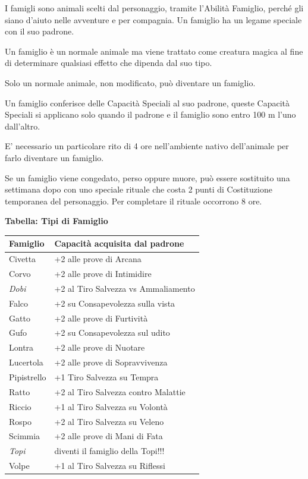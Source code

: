 \begin{multicols}{2}

I famigli sono animali scelti dal personaggio, tramite l'Abilità Famiglio, perché gli siano d'aiuto nelle avventure e per compagnia. Un famiglio ha un legame speciale con il suo padrone.

Un famiglio è un normale animale ma viene trattato come creatura magica al fine di determinare qualsiasi effetto che dipenda dal suo tipo.

Solo un normale animale, non modificato, può diventare un famiglio.

Un famiglio conferisce delle Capacità Speciali al suo padrone, queste Capacità Speciali si applicano solo quando il padrone e il famiglio sono entro 100 m l'uno dall'altro.

E' necessario un particolare rito di 4 ore nell'ambiente nativo dell'animale per farlo diventare un famiglio.

Se un famiglio viene congedato, perso oppure muore, può essere sostituito una settimana dopo con uno speciale rituale che costa 2 punti di Costituzione temporanea del personaggio. Per completare il rituale occorrono 8 ore.

\medskip

\textbf{Tabella: Tipi di Famiglio}

\medskip

\noindent\begin{tabularx}{0.5\textwidth}{lX}
\textbf{Famiglio} & \textbf{Capacità acquisita dal padrone}\\
\toprule
Civetta & +2 alle prove di Arcana\\
Corvo & +2 alle prove di Intimidire\\
\emph{Dobi}& +2 al Tiro Salvezza vs Ammaliamento\\
Falco & +2 su Consapevolezza sulla vista\\
Gatto & +2 alle prove di Furtività\\
Gufo & +2 su Consapevolezza sul udito\\
Lontra & +2 alle prove di Nuotare\\
Lucertola & +2 alle prove di Sopravvivenza\\
Pipistrello & +1 Tiro Salvezza su Tempra\\
Ratto & +2 al Tiro Salvezza contro Malattie\\
Riccio & +1 al Tiro Salvezza su Volontà\\
Rospo & +2 al Tiro Salvezza su Veleno\\
Scimmia & +2 alle prove di Mani di Fata\\
\emph{Topi} & diventi il famiglio della Topi!!!\\
Volpe & +1 al Tiro Salvezza su Riflessi
\end{tabularx}


\end{multicols}
